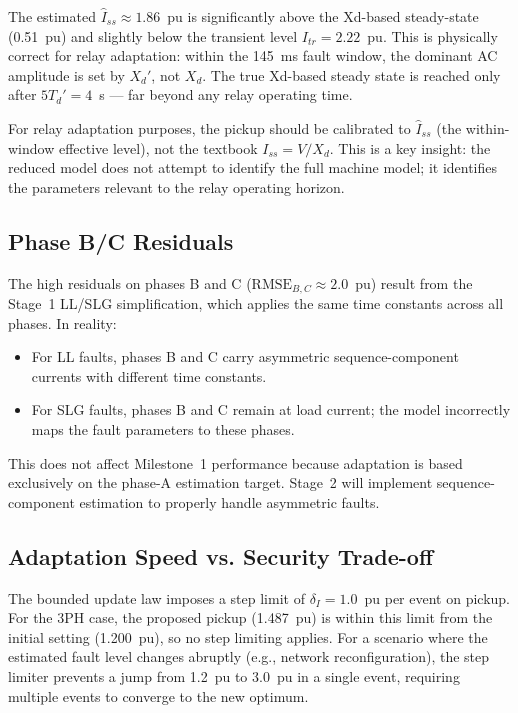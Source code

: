 \documentclass[12pt, a4paper]{article}
\theoremstyle{definition}
\theoremstyle{plain}
\begin{document}
The estimated $\hat{I}_{ss} \approx 1.86$~pu is significantly above the
Xd-based steady-state (0.51~pu) and slightly below the transient level
$I_{tr} = 2.22$~pu.  This is physically correct for relay adaptation:
within the 145~ms fault window, the dominant AC amplitude is set by
$X_d'$, not $X_d$.  The true Xd-based steady state is reached only after
$5 T_d' = 4$~s — far beyond any relay operating time.

For relay adaptation purposes, the pickup should be calibrated to
$\hat{I}_{ss}$ (the within-window effective level), not the textbook
$I_{ss} = V/X_d$.  This is a key insight: the reduced model does not
attempt to identify the full machine model; it identifies the parameters
relevant to the relay operating horizon.

\subsection{Phase B/C Residuals}
\label{sec:discussion:phases}

The high residuals on phases B and C ($\text{RMSE}_{B,C} \approx 2.0$~pu)
result from the Stage~1 LL/SLG simplification, which applies the same
time constants across all phases.  In reality:
\begin{itemize}
  \item For LL faults, phases B and C carry asymmetric sequence-component
        currents with different time constants.
  \item For SLG faults, phases B and C remain at load current; the model
        incorrectly maps the fault parameters to these phases.
\end{itemize}
This does not affect Milestone~1 performance because adaptation is based
exclusively on the phase-A estimation target.  Stage~2 will implement
sequence-component estimation to properly handle asymmetric faults.

\subsection{Adaptation Speed vs. Security Trade-off}
\label{sec:discussion:tradeoff}

The bounded update law imposes a step limit of $\delta_I = 1.0$~pu per
event on pickup.  For the 3PH case, the proposed pickup (1.487~pu) is
within this limit from the initial setting (1.200~pu), so no step limiting
applies.  For a scenario where the estimated fault level changes abruptly
(e.g., network reconfiguration), the step limiter prevents a jump from
1.2~pu to 3.0~pu in a single event, requiring multiple events to converge
to the new optimum.
\end{document}
